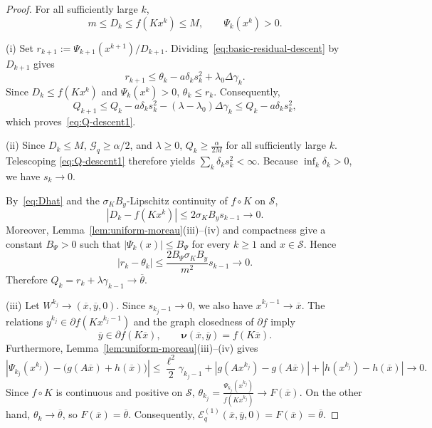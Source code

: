 \documentclass[9pt]{article}
\numberwithin{equation}{section}
\theoremstyle{definition}
\theoremstyle{remark}
\newcommand{\Sset}{\mathcal S}
\newcommand{\Gcal}{\mathcal G}
\newcommand{\Ecal}{\mathcal E}
\newcommand{\nuf}{\boldsymbol\nu}
\begin{document}
\begin{proof}
For all sufficiently large $k$,
\[
 m\leq D_k\leq f(Kx^k)\leq M,
 \qquad \Psi_k(x^k)>0.
\]

(i) Set $r_{k+1}:=\Psi_{k+1}(x^{k+1})/D_{k+1}$.
Dividing~\eqref{eq:basic-residual-descent} by $D_{k+1}$ gives
\[
 r_{k+1}\leq\theta_k-a\delta_ks_k^2
                 +\lambda_0\Delta\gamma_k.
\]
Since $D_k\leq f(Kx^k)$ and $\Psi_k(x^k)>0$,
$\theta_k\leq r_k$. Consequently,
\[
 Q_{k+1}
 \leq Q_k-a\delta_ks_k^2
       -(\lambda-\lambda_0)\Delta\gamma_k
 \leq Q_k-a\delta_ks_k^2,
\]
which proves~\eqref{eq:Q-descent1}.

(ii) Since $D_k\leq M$, $\Gcal_q\geq\alpha/2$, and
$\lambda\geq0$,
$
 Q_k\geq\frac{\alpha}{2M}$
for all sufficiently large $k$. Telescoping
\eqref{eq:Q-descent1} therefore yields
$\sum_k\delta_ks_k^2<\infty$. Because
$\inf_k\delta_k>0$, we have $s_k\to0$.

By~\eqref{eq:Dhat} and the $\sigma_KB_y$-Lipschitz continuity of
$f\circ K$ on $\Sset$,
\[
 |D_k-f(Kx^k)|
 \leq2\sigma_KB_y s_{k-1}\longrightarrow0.
\]
Moreover, Lemma~\ref{lem:uniform-moreau}(iii)--(iv) and compactness
give a constant $B_\Psi>0$ such that
$|\Psi_k(x)|\leq B_\Psi$ for every $k\geq1$ and $x\in\Sset$.
Hence
\[
 |r_k-\theta_k|
 \leq
 \frac{2B_\Psi\sigma_KB_y}{m^2}s_{k-1}
 \longrightarrow0.
\]
Therefore
$Q_k=r_k+\lambda\gamma_{k-1}\to\overline\theta$.

(iii) Let $W^{k_j}\to(\overline x,\overline y,0)$. Since
$s_{k_j-1}\to0$, we also have $x^{k_j-1}\to\overline x$.
The relations
$y^{k_j}\in\partial f(Kx^{k_j-1})$ and the graph closedness of
$\partial f$ imply
\[
 \overline y\in\partial f(K\overline x),
 \qquad
 \nuf(\overline x,\overline y)=f(K\overline x).
\]
Furthermore, Lemma~\ref{lem:uniform-moreau}(iii)--(iv) gives
\[
 \left|\Psi_{k_j}(x^{k_j})
 -\bigl(g(A\overline x)+h(\overline x)\bigr)\right|
\leq\frac{\ell^2}{2}\gamma_{k_j-1}
 +|g(Ax^{k_j})-g(A\overline x)|
 +|h(x^{k_j})-h(\overline x)|
 \rightarrow0.
\]
Since $f\circ K$ is continuous and positive on $\Sset$,
$
 \theta_{k_j}
 =\frac{\Psi_{k_j}(x^{k_j})}{f(Kx^{k_j})}
 \rightarrow F(\overline x).
$
On the other hand, $\theta_k\to\overline\theta$, so
$F(\overline x)=\overline\theta$. Consequently,
$
 \Ecal_q^{(1)}(\overline x,\overline y,0)
 =F(\overline x)=\overline\theta.
$
\end{proof}
\end{document}
